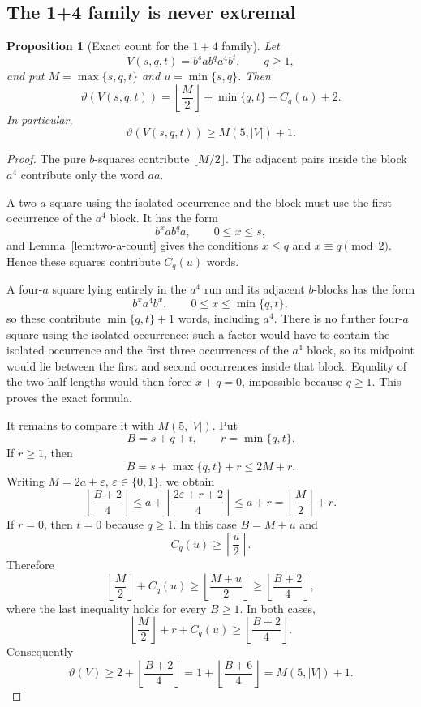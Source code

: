 \documentclass[11pt]{article}
\newtheorem{proposition}[theorem]{Proposition}
\theoremstyle{definition}
\newcommand{\thetaas}{\vartheta}
\begin{document}
\subsection{The 1+4 family is never extremal}

\begin{proposition}[Exact count for the $1+4$ family]\label{prop:x5-14}
Let
\[
 V(s,q,t)=b^s a b^q a^4 b^t,\qquad q\ge1,
\]
and put $M=\max\{s,q,t\}$ and $u=\min\{s,q\}$. Then
\[
 \thetaas(V(s,q,t))
 =\left\lfloor\frac M2\right\rfloor+\min\{q,t\}+C_q(u)+2.
\]
In particular,
\[
 \thetaas(V(s,q,t))\ge M(5,|V|)+1.
\]
\end{proposition}

\begin{proof}
The pure $b$-squares contribute $\lfloor M/2\rfloor$. The adjacent pairs inside the block $a^4$ contribute only the word $aa$.

A two-$a$ square using the isolated occurrence and the block must use the first occurrence of the $a^4$ block. It has the form
\[
 b^x a b^q a,
 \qquad0\le x\le s,
\]
and Lemma~\ref{lem:two-a-count} gives the conditions $x\le q$ and $x\equiv q\pmod2$. Hence these squares contribute $C_q(u)$ words.

A four-$a$ square lying entirely in the $a^4$ run and its adjacent $b$-blocks has the form
\[
 b^x a^4b^x,
 \qquad0\le x\le\min\{q,t\},
\]
so these contribute $\min\{q,t\}+1$ words, including $a^4$. There is no further four-$a$ square using the isolated occurrence: such a factor would have to contain the isolated occurrence and the first three occurrences of the $a^4$ block, so its midpoint would lie between the first and second occurrences inside that block. Equality of the two half-lengths would then force $x+q=0$, impossible because $q\ge1$. This proves the exact formula.

It remains to compare it with $M(5,|V|)$. Put
\[
 B=s+q+t,\qquad r=\min\{q,t\}.
\]
If $r\ge1$, then
\[
 B=s+\max\{q,t\}+r\le2M+r.
\]
Writing $M=2a+\varepsilon$, $\varepsilon\in\{0,1\}$, we obtain
\[
 \left\lfloor\frac{B+2}{4}\right\rfloor
 \le a+\left\lfloor\frac{2\varepsilon+r+2}{4}\right\rfloor
 \le a+r
 =\left\lfloor\frac M2\right\rfloor+r.
\]
If $r=0$, then $t=0$ because $q\ge1$. In this case $B=M+u$ and
\[
 C_q(u)\ge\left\lceil\frac u2\right\rceil.
\]
Therefore
\[
 \left\lfloor\frac M2\right\rfloor+C_q(u)
 \ge\left\lfloor\frac{M+u}{2}\right\rfloor
 \ge\left\lfloor\frac{B+2}{4}\right\rfloor,
\]
where the last inequality holds for every $B\ge1$. In both cases,
\[
 \left\lfloor\frac M2\right\rfloor+r+C_q(u)
 \ge\left\lfloor\frac{B+2}{4}\right\rfloor.
\]
Consequently
\[
 \thetaas(V)
 \ge2+\left\lfloor\frac{B+2}{4}\right\rfloor
 =1+\left\lfloor\frac{B+6}{4}\right\rfloor
 =M(5,|V|)+1.
\]
\end{proof}
\end{document}
